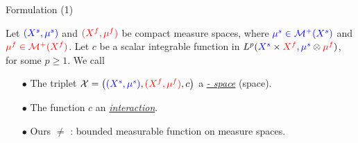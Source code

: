 \documentclass{beamer}
\newcommand{\cX}{\mathcal X}
\newcommand{\cM}{\mathcal M}
\newcommand{\sfspace}{{\color{blue}{s.}}{\color{red}{f. }}}
\begin{document}
\begin{frame}{Formulation (1)}
\scriptsize
  \begin{definition}
    Let ${\color{blue}{(X^s, \mu^s)}}$ and ${\color{red}{(X^f, \mu^f)}}$ be compact measure spaces, where ${\color{blue}{\mu^s \in \cM^+(X^s)}}$ and ${\color{red}{\mu^f \in \cM^+(X^f)}}$. Let $c$ be a scalar integrable function in $L^p({\color{blue}{X^s}} \times {\color{red}{X^f}}, {\color{blue}{\mu^s}} \otimes {\color{red}{\mu^f}})$, for some $p \geq 1$. We call
    \begin{itemize}
      \setlength\itemindent{10pt}
      \item[$\bullet$] The triplet
      $\cX = \left({\color{blue}{(X^s, \mu^s)}}, {\color{red}{(X^f, \mu^f)}}, c \right)$
      a \underline{\textit{{\color{blue}{sample}} - {\color{red}{feature}} space}}
      (\sfspace space).

      \item[$\bullet$] The function $c$ an \textit{\underline{interaction}}.
    \end{itemize}
  \end{definition}
  \begin{itemize}
    \setlength\itemindent{5pt}
    \item[$\bullet$] Ours $\neq$ \parencite{Chowdhury21b}: bounded measurable function on measure spaces.
  \end{itemize}


\end{frame}
\end{document}
